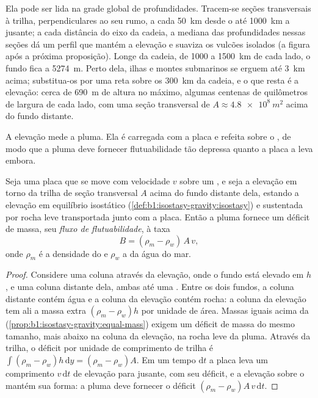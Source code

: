 Ela pode ser lida na grade global de profundidades. Tracem-se seções transversais à trilha, perpendiculares ao seu rumo, a cada \qty{50}{km} desde o  até \qty{1000}{km} a jusante; a cada distância do eixo da cadeia, a mediana das profundidades nessas seções dá um perfil que mantém a elevação e suaviza os vulcões isolados (a figura após a próxima proposição). Longe da cadeia, de 1000 a \qty{1500}{km} de cada lado, o fundo fica a \qty{5274}{m}. Perto dela, ilhas e montes submarinos se erguem até \qty{3}{km} acima; substitua-os por uma reta sobre os \qty{300}{km} da cadeia, e o que resta é a elevação: cerca de \qty{690}{m} de altura no máximo, algumas centenas de quilômetros de largura de cada lado, com uma seção transversal de $A \approx \qty{4.8e8}{m^2}$ acima do fundo distante.

A elevação mede a pluma. Ela é carregada com a placa e refeita sobre o , de modo que a pluma deve fornecer flutuabilidade tão depressa quanto a placa a leva embora.

\begin{proposition}\label{prop:b1:hotspots:buoyancy}
Seja uma placa que se move com velocidade $v$ sobre um , e seja a elevação em torno da trilha de seção transversal $A$ acima do fundo distante dela, estando a elevação em equilíbrio isostático (\cref{def:b1:isostasy-gravity:isostasy}) e sustentada por rocha leve transportada junto com a placa. Então a pluma fornece um déficit de massa, seu \emph{fluxo de flutuabilidade}, à taxa
\[
  B = (\rho_m - \rho_w)\,A\,v ,
\]
onde $\rho_m$ é a densidade do  e $\rho_w$ a da água do mar.
\end{proposition}

\begin{proof}
Considere uma coluna através da elevação, onde o fundo está elevado em $h$, e uma coluna distante dela, ambas até uma . Entre os dois fundos, a coluna distante contém água e a coluna da elevação contém rocha: a coluna da elevação tem ali a massa extra $(\rho_m - \rho_w)h$ por unidade de área. Massas iguais acima da  (\cref{prop:b1:isostasy-gravity:equal-mass}) exigem um déficit de massa do mesmo tamanho, mais abaixo na coluna da elevação, na rocha leve da pluma. Através da trilha, o déficit por unidade de comprimento de trilha é $\int(\rho_m - \rho_w)h\,\mathrm dy = (\rho_m - \rho_w)A$. Em um tempo $\mathrm dt$ a placa leva um comprimento $v\,\mathrm dt$ de elevação para jusante, com seu déficit, e a elevação sobre o  mantém sua forma: a pluma deve fornecer o déficit $(\rho_m - \rho_w)A\,v\,\mathrm dt$.
\end{proof}

